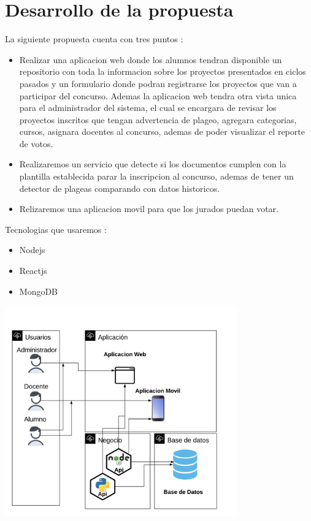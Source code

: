 \documentclass[%
 reprint,
 amsmath,amssymb,
 aps,
]{revtex4-1}
\begin{document}
\section {Desarrollo de la propuesta}
La siguiente propuesta cuenta con tres puntos :
\begin{itemize}
\item Realizar una aplicacion web donde los alumnos tendran disponible un repositorio con toda la informacion sobre los proyectos presentados en ciclos pasados y un formulario donde podran registrarse los proyectos que van a participar del concurso. Ademas la aplicacion web tendra otra vista unica para el administrador del sistema, el cual se encargara de revisar los proyectos inscritos que tengan advertencia de plageo, agregara categorias, cursos, asignara docentes al concurso, ademas de poder visualizar el reporte de votos.  
\item Realizaremos un servicio que detecte si los documentos cumplen con la plantilla establecida parar la inscripcion al concurso, ademas de tener un detector de plageas comparando con datos historicos.
\item Relizaremos una aplicacion movil para que los jurados puedan votar.
\end{itemize}
\newpage
Tecnologias que usaremos :
\begin{itemize}
\item Nodejs
\item Reactjs
\item MongoDB
\end{itemize}
\begin{center}
\includegraphics[width=10cm]{./Imagenes/arquitectura2}
\end{center}
\end{document}
